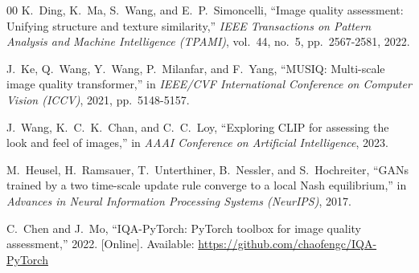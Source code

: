 \documentclass[conference]{IEEEtran}
\begin{document}
\begin{thebibliography}{00}
 K.~Ding, K.~Ma, S.~Wang, and E.~P.~Simoncelli, ``Image quality assessment: Unifying structure and texture similarity,'' \emph{IEEE Transactions on Pattern Analysis and Machine Intelligence (TPAMI)}, vol.~44, no.~5, pp.~2567-2581, 2022.

 J.~Ke, Q.~Wang, Y.~Wang, P.~Milanfar, and F.~Yang, ``MUSIQ: Multi-scale image quality transformer,'' in \emph{IEEE/CVF International Conference on Computer Vision (ICCV)}, 2021, pp.~5148-5157.

 J.~Wang, K.~C.~K.~Chan, and C.~C.~Loy, ``Exploring CLIP for assessing the look and feel of images,'' in \emph{AAAI Conference on Artificial Intelligence}, 2023.

 M.~Heusel, H.~Ramsauer, T.~Unterthiner, B.~Nessler, and S.~Hochreiter, ``GANs trained by a two time-scale update rule converge to a local Nash equilibrium,'' in \emph{Advances in Neural Information Processing Systems (NeurIPS)}, 2017.

 C.~Chen and J.~Mo, ``IQA-PyTorch: PyTorch toolbox for image quality assessment,'' 2022. [Online]. Available: \url{https://github.com/chaofengc/IQA-PyTorch}

\end{thebibliography}
\end{document}
